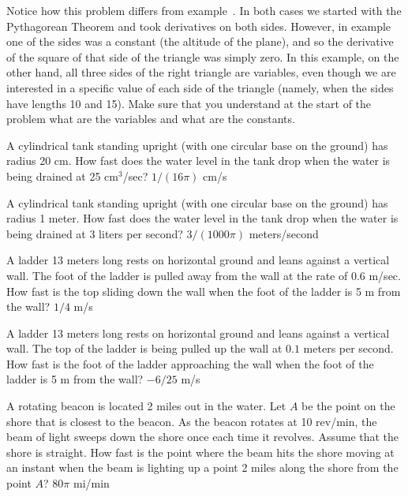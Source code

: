 
Notice how this problem differs from example~.  In both cases we started with the Pythagorean Theorem and
took derivatives on both sides.  However, in
example~ one of the sides was a constant
(the altitude of the plane), and so the derivative of the square of
that side of the triangle was simply zero.  In this example, on the
other hand, all three sides of the right triangle are variables, even
though we are interested in a specific value of each side of the
triangle (namely, when the sides have lengths 10 and 15). Make sure that
you understand at the start of the problem what are the variables and
what are the constants.

\exercises

\exercise
A cylindrical tank standing upright (with one circular base on the
ground) has radius 20 cm.  How fast does the water level in the
tank drop when the water is being drained at 25 cm${}^3$/sec?
\answer $1/(16\pi)$ cm/s
\endanswer
\endexercise

\exercise
A cylindrical tank standing upright (with one circular base on the
ground) has radius 1 meter.  How fast does the water level in the
tank drop when the water is being drained at 3 liters per second?
\answer $3/(1000\pi)$ meters/second
\endanswer
\endexercise

\exercise A ladder 13 meters long rests on horizontal ground and leans
against a vertical wall.  The foot of the ladder is pulled away from
the wall at the rate of 0.6 m/sec.  How fast is the top sliding down
the wall when the foot of the ladder is 5 m from the wall?
\answer $1/4$ m/s
\endanswer
\endexercise

\exercise A ladder 13 meters long rests on horizontal ground and leans
against a vertical wall. The top of the ladder is being pulled up the
wall at $0.1$ meters per second.
How fast is the foot of the ladder approaching 
the wall when the foot of the ladder is 5 m from the wall?
\answer $-6/25$ m/s
\endanswer
\endexercise

\exercise
A rotating beacon is located 2 miles out in the water.  Let $A$ be the
point on the shore that is closest to the beacon.  As the beacon rotates at
10 rev/min, the beam of light sweeps down the shore once each time it revolves.
Assume that the shore is straight.  How fast is the point where the beam
hits the shore moving at an instant when the beam is lighting up a point 2
miles along the shore from the point $A$?
\answer $80\pi$ mi/min
\endanswer
\endexercise

